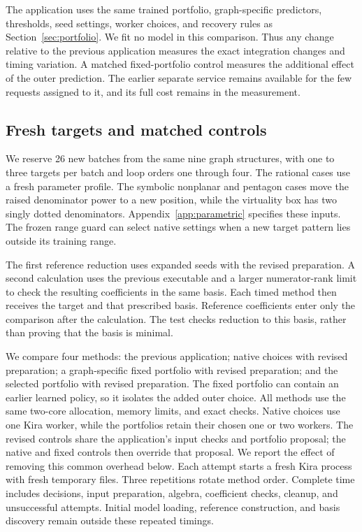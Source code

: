 The application uses the same trained portfolio, graph-specific predictors, thresholds, seed settings, worker choices, and recovery rules as Section~\ref{sec:portfolio}. We fit no model in this comparison. Thus any change relative to the previous application measures the exact integration changes and timing variation. A matched fixed-portfolio control measures the additional effect of the outer prediction. The earlier separate service remains available for the few requests assigned to it, and its full cost remains in the measurement.

\subsection{Fresh targets and matched controls}
We reserve 26 new batches from the same nine graph structures, with one to three targets per batch and loop orders one through four. The rational cases use a fresh parameter profile. The symbolic nonplanar and pentagon cases move the raised denominator power to a new position, while the virtuality box has two singly dotted denominators. Appendix~\ref{app:parametric} specifies these inputs. The frozen range guard can select native settings when a new target pattern lies outside its training range.

The first reference reduction uses expanded seeds with the revised preparation. A second calculation uses the previous executable and a larger numerator-rank limit to check the resulting coefficients in the same basis. Each timed method then receives the target and that prescribed basis. Reference coefficients enter only the comparison after the calculation. The test checks reduction to this basis, rather than proving that the basis is minimal.

We compare four methods: the previous application; native choices with revised preparation; a graph-specific fixed portfolio with revised preparation; and the selected portfolio with revised preparation. The fixed portfolio can contain an earlier learned policy, so it isolates the added outer choice. All methods use the same two-core allocation, memory limits, and exact checks. Native choices use one Kira worker, while the portfolios retain their chosen one or two workers. The revised controls share the application's input checks and portfolio proposal; the native and fixed controls then override that proposal. We report the effect of removing this common overhead below. Each attempt starts a fresh Kira process with fresh temporary files. Three repetitions rotate method order. Complete time includes decisions, input preparation, algebra, coefficient checks, cleanup, and unsuccessful attempts. Initial model loading, reference construction, and basis discovery remain outside these repeated timings.

